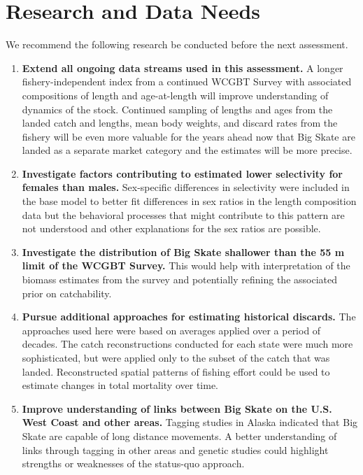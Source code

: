 \documentclass[]{article}
\title{}
\author{}
\date{}
\begin{document}
\hypertarget{research-and-data-needs}{%
\section{Research and Data Needs}\label{research-and-data-needs}}

We recommend the following research be conducted before the next
assessment.

\begin{enumerate}

\item \textbf{Extend all ongoing data streams used in this assessment.} A longer fishery-independent index from a continued WCGBT Survey with associated compositions of length and age-at-length will improve understanding of dynamics of the stock. Continued sampling of lengths and ages from the landed catch and lengths, mean body weights, and discard rates from the fishery will be even more valuable for the years ahead now that Big Skate are landed as a separate market category and the estimates will be more precise.

\item \textbf{Investigate factors contributing to estimated lower selectivity for females than males.} Sex-specific differences in selectivity were included in the base model to better fit differences in sex ratios in the length composition data but the behavioral processes that might contribute to this pattern are not understood and other explanations for the sex ratios are possible.

\item \textbf{Investigate the distribution of Big Skate shallower than the 55 m limit of the WCGBT Survey.} This would help with interpretation of the biomass estimates from the survey and potentially refining the associated prior on catchability.

\item \textbf{Pursue additional approaches for estimating historical discards.} The approaches used here were based on averages applied over a period of decades. The catch reconstructions conducted for each state were much more sophisticated, but were applied only to the subset of the catch that was landed. Reconstructed spatial patterns of fishing effort could be used to estimate changes in total mortality over time.

\item \textbf{Improve understanding of links between Big Skate on the U.S. West Coast and other areas.} Tagging studies in Alaska indicated that Big Skate are capable of long distance movements. A better understanding of links through tagging in other areas and genetic studies could highlight strengths or weaknesses of the status-quo approach.


\end{enumerate}
\end{document}

